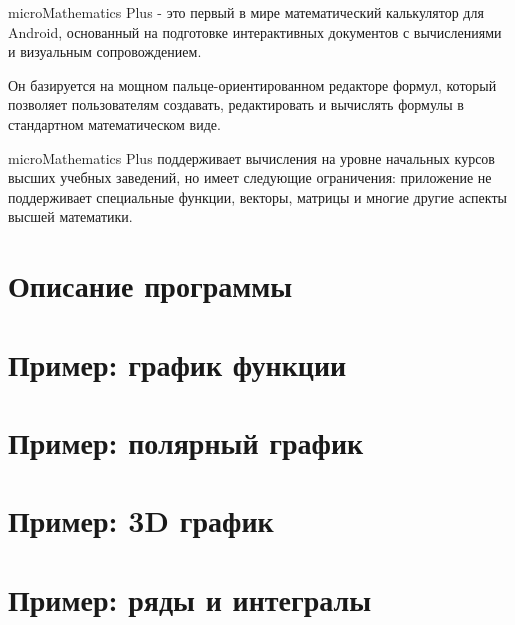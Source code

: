\documentclass[DIV=calc, paper=a4, fontsize=11pt, twocolumn]{scrartcl}
\begin{document}
\maketitle
\thispagestyle{fancy} %

\begin{bf}
microMathematics Plus - это первый в мире математический
калькулятор для Android, основанный на подготовке интерактивных документов с
вычислениями и визуальным сопровождением.

Он базируется на мощном пальце-ориентированном редакторе формул, который
позволяет пользователям создавать, редактировать и вычислять формулы в
стандартном математическом виде.

microMathematics Plus поддерживает вычисления на уровне начальных курсов
высших учебных заведений, но имеет следующие ограничения: приложение не
поддерживает специальные функции, векторы, матрицы и многие другие аспекты
высшей математики.
\end{bf}

\section{Описание программы}


\section{Пример: график функции}


\section{Пример: полярный график}


\section{Пример: 3D график}


\section{Пример: ряды и интегралы}

\end{document}
